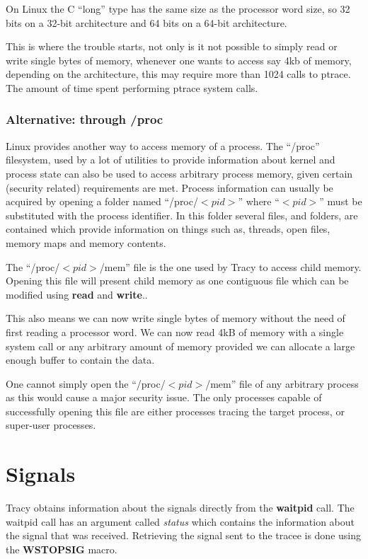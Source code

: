 \documentclass[a4paper, 10pt]{report}
\begin{document}
On Linux the C ``long'' type has the same size as the
processor word size, so 32 bits on a 32-bit architecture and
64 bits on a 64-bit architecture.

This is where the trouble starts, not only is it not possible to simply read
or write single bytes of memory, whenever one wants to access say 4kb of
memory, depending on the architecture, this may require more than 1024
calls to ptrace. The amount of time spent performing ptrace system calls.

\subsubsection{Alternative: through /proc}
Linux provides another way to access memory of a process. The ``/proc''
filesystem, used by a lot of utilities to provide information about kernel
and process state can also be used to access arbitrary process memory,
given certain (security related) requirements are met.
Process information can usually be acquired by opening a folder
named ``/proc/$<pid>$'' where ``$<pid>$'' must be substituted with the process
identifier. In this folder several files, and folders, are contained which
provide information on things such as, threads, open files, memory maps and
memory contents.

The ``/proc/$<pid>$/mem'' file is the one used by Tracy to access child memory.
Opening this file will present child memory as one contiguous file which
can be modified using \textbf{read} and \textbf{write}..

This also means we can now write single bytes of memory without the need
of first reading a processor word. We can now read 4kB of memory with a
single system call or any arbitrary amount of memory provided we can allocate
a large enough buffer to contain the data.

One cannot simply open the ``/proc/$<pid>$/mem'' file of any
arbitrary process as this would cause a major security issue. The only
processes capable of successfully opening this file are either processes
tracing the target process, or super-user processes.

\section{Signals}

Tracy obtains information about the signals directly from the
\textbf{waitpid} call. The waitpid call has an argument called
\textit{status} which contains the information about the signal that was
received. Retrieving the signal sent to the tracee is done using the
\textbf{WSTOPSIG} macro. \\
\end{document}
